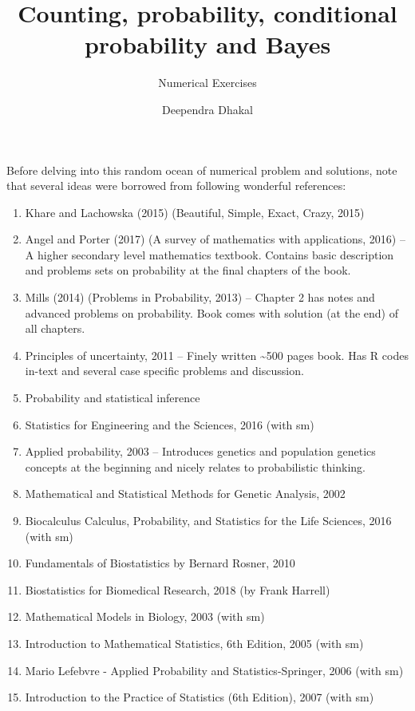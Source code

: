 \documentclass[
  answers,addpoints,12pt]{exam}
\title{Counting, probability, conditional probability and Bayes}
\subtitle{Numerical Exercises}
\author{Deependra Dhakal}
\date{}
\providecommand{\tightlist}{%
  \setlength{\itemsep}{0pt}\setlength{\parskip}{0pt}}
\begin{document}
\maketitle

Before delving into this random ocean of numerical problem and solutions, note that several ideas were borrowed from following wonderful references:

\begin{enumerate}
\def\labelenumi{\arabic{enumi}.}
\tightlist
\item
  Khare and Lachowska (2015) (Beautiful, Simple, Exact, Crazy, 2015)
\item
  Angel and Porter (2017) (A survey of mathematics with applications, 2016) -- A higher secondary level mathematics textbook. Contains basic description and problems sets on probability at the final chapters of the book.
\item
  Mills (2014) (Problems in Probability, 2013) -- Chapter 2 has notes and advanced problems on probability. Book comes with solution (at the end) of all chapters.
\item
  Principles of uncertainty, 2011 -- Finely written \textasciitilde500 pages book. Has R codes in-text and several case specific problems and discussion.
\item
  Probability and statistical inference
\item
  Statistics for Engineering and the Sciences, 2016 (with sm)
\item
  Applied probability, 2003 -- Introduces genetics and population genetics concepts at the beginning and nicely relates to probabilistic thinking.
\item
  Mathematical and Statistical Methods for Genetic Analysis, 2002
\item
  Biocalculus Calculus, Probability, and Statistics for the Life Sciences, 2016 (with sm)
\item
  Fundamentals of Biostatistics by Bernard Rosner, 2010
\item
  Biostatistics for Biomedical Research, 2018 (by Frank Harrell)
\item
  Mathematical Models in Biology, 2003 (with sm)
\item
  Introduction to Mathematical Statistics, 6th Edition, 2005 (with sm)
\item
  Mario Lefebvre - Applied Probability and Statistics-Springer, 2006 (with sm)
\item
  Introduction to the Practice of Statistics (6th Edition), 2007 (with sm)

\end{enumerate}
\end{document}
